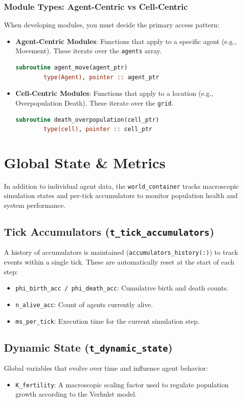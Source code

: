 \subsubsection{Module Types: Agent-Centric vs Cell-Centric}
When developing modules, you must decide the primary access pattern:
\begin{itemize}
    \item \textbf{Agent-Centric Modules}: Functions that apply to a specific agent (e.g., Movement). These iterate over the \texttt{agents} array.
    \begin{lstlisting}[language=Fortran]
    subroutine agent_move(agent_ptr)
        type(Agent), pointer :: agent_ptr
    \end{lstlisting}
    \item \textbf{Cell-Centric Modules}: Functions that apply to a location (e.g., Overpopulation Death). These iterate over the \texttt{grid}.
    \begin{lstlisting}[language=Fortran]
    subroutine death_overpopulation(cell_ptr)
        type(cell), pointer :: cell_ptr
    \end{lstlisting}
\end{itemize}

\section{Global State \& Metrics}
In addition to individual agent data, the \texttt{world\_container} tracks macroscopic simulation states and per-tick accumulators to monitor population health and system performance.

\subsection{Tick Accumulators (\texttt{t\_tick\_accumulators})}
A history of accumulators is maintained (\texttt{accumulators\_history(:)}) to track events within a single tick. These are automatically reset at the start of each step:
\begin{itemize}
    \item \texttt{phi\_birth\_acc / phi\_death\_acc}: Cumulative birth and death counts.
    \item \texttt{n\_alive\_acc}: Count of agents currently alive.
    \item \texttt{ms\_per\_tick}: Execution time for the current simulation step.
\end{itemize}

\subsection{Dynamic State (\texttt{t\_dynamic\_state})}
Global variables that evolve over time and influence agent behavior:
\begin{itemize}
    \item \texttt{K\_fertility}: A macroscopic scaling factor used to regulate population growth according to the Verhulst model.
\end{itemize}


